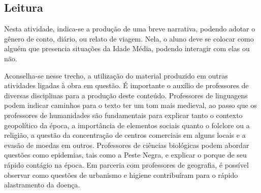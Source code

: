 \documentclass[12pt]{extarticle}
\begin{document}
\subsection{Leitura}

Nesta atividade, indica-se a produção de uma breve
narrativa, podendo adotar o gênero de conto, diário, ou relato de
viagem. Nela, o aluno deve se colocar como alguém que presencia
situações da Idade Média, podendo interagir com elas ou não.

Aconselha-se nesse trecho, a utilização do material produzido em outras
atividades ligadas à obra em questão. É importante o auxílio de
professores de diversas disciplinas para a produção deste conteúdo.
Professores de linguagens podem indicar caminhos para o texto ter um tom
mais medieval, ao passo que os professores de humanidades são
fundamentais para explicar tanto o contexto geopolítico da época, a
importância de elementos sociais quanto o folclore ou a religião, a
questão da concentração de centros comerciais em alguns locais e a
evasão de moedas em outros. Professores de ciências biológicas podem
abordar questões como epidemias, tais como a Peste Negra, e explicar o
porque de seu rápido contágio na época. Em parceria com professores de
geografia, é possível observar como questões de urbanismo e higiene
contribuíram para o rápido alastramento da doença.
\end{document}
